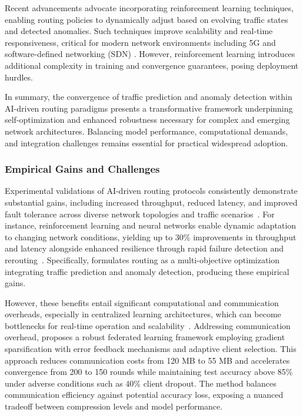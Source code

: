 \documentclass[sigconf]{acmart}
\begin{document}
Recent advancements advocate incorporating reinforcement learning techniques, enabling routing policies to dynamically adjust based on evolving traffic states and detected anomalies. Such techniques improve scalability and real-time responsiveness, critical for modern network environments including 5G and software-defined networking (SDN) \cite{ref53}. However, reinforcement learning introduces additional complexity in training and convergence guarantees, posing deployment hurdles.

In summary, the convergence of traffic prediction and anomaly detection within AI-driven routing paradigms presents a transformative framework underpinning self-optimization and enhanced robustness necessary for complex and emerging network architectures. Balancing model performance, computational demands, and integration challenges remains essential for practical widespread adoption.

\subsubsection{Empirical Gains and Challenges}

Experimental validations of AI-driven routing protocols consistently demonstrate substantial gains, including increased throughput, reduced latency, and improved fault tolerance across diverse network topologies and traffic scenarios~\cite{ref4,ref53}. For instance, reinforcement learning and neural networks enable dynamic adaptation to changing network conditions, yielding up to 30\% improvements in throughput and latency alongside enhanced resilience through rapid failure detection and rerouting~\cite{ref53}. Specifically, \cite{ref53} formulates routing as a multi-objective optimization integrating traffic prediction and anomaly detection, producing these empirical gains. 

However, these benefits entail significant computational and communication overheads, especially in centralized learning architectures, which can become bottlenecks for real-time operation and scalability~\cite{ref53}. Addressing communication overhead, \cite{ref4} proposes a robust federated learning framework employing gradient sparsification with error feedback mechanisms and adaptive client selection. This approach reduces communication costs from 120 MB to 55 MB and accelerates convergence from 200 to 150 rounds while maintaining test accuracy above 85\% under adverse conditions such as 40\% client dropout. The method balances communication efficiency against potential accuracy loss, exposing a nuanced tradeoff between compression levels and model performance. 
\end{document}
